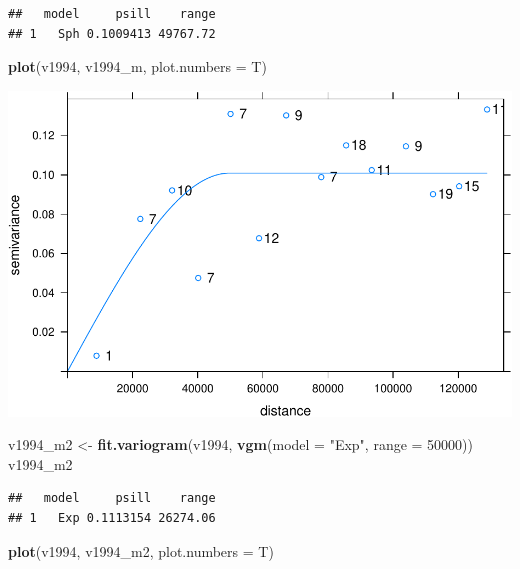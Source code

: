 \documentclass[11pt,]{article}
\newenvironment{Shaded}{\begin{snugshade}}{\end{snugshade}}
\newcommand{\KeywordTok}[1]{\textcolor[rgb]{0.13,0.29,0.53}{\textbf{#1}}}
\newcommand{\DataTypeTok}[1]{\textcolor[rgb]{0.13,0.29,0.53}{#1}}
\newcommand{\DecValTok}[1]{\textcolor[rgb]{0.00,0.00,0.81}{#1}}
\newcommand{\StringTok}[1]{\textcolor[rgb]{0.31,0.60,0.02}{#1}}
\newcommand{\NormalTok}[1]{#1}
\begin{document}
\begin{verbatim}
##   model     psill    range
## 1   Sph 0.1009413 49767.72
\end{verbatim}

\begin{Shaded}
\begin{Highlighting}[]
\KeywordTok{plot}\NormalTok{(v1994, v1994_m, }\DataTypeTok{plot.numbers =}\NormalTok{ T)}
\end{Highlighting}
\end{Shaded}

\includegraphics{proyecto_files/figure-latex/unnamed-chunk-4-6.pdf}

\begin{Shaded}
\begin{Highlighting}[]
\NormalTok{v1994_m2 <-}\StringTok{ }\KeywordTok{fit.variogram}\NormalTok{(v1994, }\KeywordTok{vgm}\NormalTok{(}\DataTypeTok{model =} \StringTok{"Exp"}\NormalTok{, }\DataTypeTok{range =} \DecValTok{50000}\NormalTok{))}
\NormalTok{v1994_m2}
\end{Highlighting}
\end{Shaded}

\begin{verbatim}
##   model     psill    range
## 1   Exp 0.1113154 26274.06
\end{verbatim}

\begin{Shaded}
\begin{Highlighting}[]
\KeywordTok{plot}\NormalTok{(v1994, v1994_m2, }\DataTypeTok{plot.numbers =}\NormalTok{ T)}
\end{Highlighting}
\end{Shaded}
\end{document}
